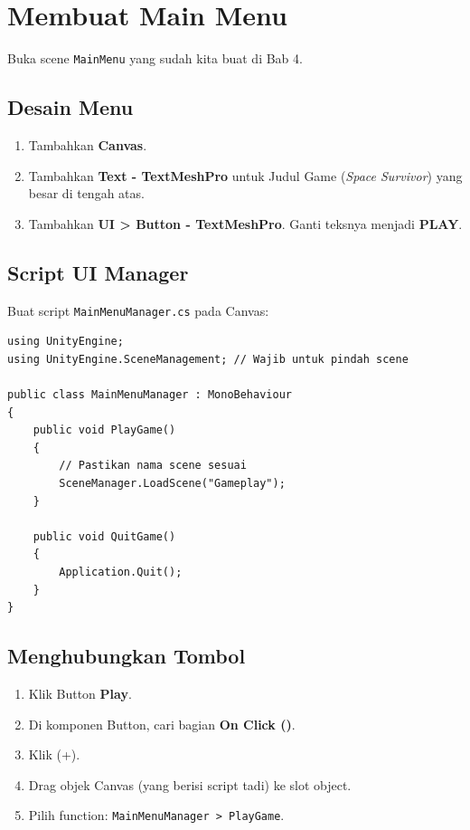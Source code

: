 
\section{Membuat Main Menu}

Buka scene \texttt{MainMenu} yang sudah kita buat di Bab 4.

\subsection{Desain Menu}
\begin{enumerate}
    \item Tambahkan \textbf{Canvas}.
    \item Tambahkan \textbf{Text - TextMeshPro} untuk Judul Game (\textit{Space Survivor}) yang besar di tengah atas.
    \item Tambahkan \textbf{UI > Button - TextMeshPro}. Ganti teksnya menjadi \textbf{PLAY}.
\end{enumerate}

\subsection{Script UI Manager}
Buat script \texttt{MainMenuManager.cs} pada Canvas:

\begin{lstlisting}[language={[Sharp]C}]
using UnityEngine;
using UnityEngine.SceneManagement; // Wajib untuk pindah scene

public class MainMenuManager : MonoBehaviour
{
    public void PlayGame()
    {
        // Pastikan nama scene sesuai
        SceneManager.LoadScene("Gameplay");
    }
    
    public void QuitGame()
    {
        Application.Quit();
    }
}
\end{lstlisting}

\subsection{Menghubungkan Tombol}
\begin{enumerate}
    \item Klik Button \textbf{Play}.
    \item Di komponen Button, cari bagian \textbf{On Click ()}.
    \item Klik (+).
    \item Drag objek Canvas (yang berisi script tadi) ke slot object.
    \item Pilih function: \texttt{MainMenuManager > PlayGame}.
\end{enumerate}
